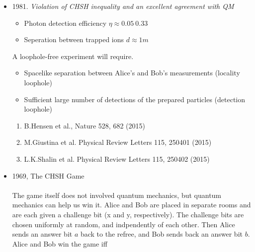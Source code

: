 \documentclass[]{article}
\newtheorem*{example}{Example}
\theoremstyle{nonumberplain}
\begin{document}
\begin{itemize}
\\ \\ 
\[
	QS+RS+RT-QT = (Q+R)S+(R-Q)T = \pm 2
\] 
\[
	(Suppose\ R,Q = \pm 1.\ Thus,\ (R+Q)S=0\ or\ (R-Q)T=0)
\] 
\\
Emsemble average:\ (The curly words mean operator)
\[
	E(\mathcal{QS+RS+RT-QT}) = \sum^{}_{} p(Q,R,S,T)(QS+RS+RT-QT) \leq \sum^{}_{} p(Q,R,S,T)\cdot2 = 2
\] 
\begin{center}
\textit{\textbf{Quantum Theory}}
\end{center}
\[
	E(\mathcal{QS+RS+RT-QT}) = \braket{\psi|\mathcal{QS+RS+RT-QT}|\psi} = \braket{\mathcal{QS}} + \braket{\mathcal{RS}} +\braket{\mathcal{RT}} - \braket{\mathcal{QT}} 
\] 
\begin{example}
\[
	\ket{\psi}=\frac{1}{\sqrt{2}}(\ket{01}-\ket{10})
\] 
\[
Q=Z_{1}\ \ R=X_{1}\ \  S= \frac{-Z_{2}-X_{2}}{\sqrt{2}}\ \ T= \frac{Z_{2}-X_{2}}{\sqrt{2}}
\] 
\[
\braket{\mathcal{QS}} + \braket{\mathcal{RS}}+ \braket{\mathcal{RT}} -\braket{\mathcal{QT}} = 2\sqrt{2} > 2 !!\textit{\textbf{ The Quantum Theory violates Bell's inequality.}}
\] 
\end{example}
	\item 1981. \textit{Violation of CHSH inequality and an excellent agreement with QM}
\begin{itemize}
	\item Photon detection efficiency $\eta \approx 0.05 ~ 0.33$
	\item Seperation between trapped ions $d\approx 1m$
\end{itemize}
	A loophole-free experiment will require.
\begin{itemize}
	\item Spacelike separation between Alice's and Bob's measurements (locality loophole)
	\item Sufficient large number of detections of the prepared particles (detection loophole)
\end{itemize}
\begin{enumerate}
	\item B.Hensen et al., Nature 528, 682 (2015)
	\item M.Giustina et al. Physical Review Letters 115, 250401 (2015)
	\item L.K.Shalin et al. Physical Review Letters 115, 250402 (2015)
\end{enumerate}
	\item 1969, The CHSH Game  \\
		\\
		The game itself does not involved quantum mechanics, but quantum mechanics can help us win it. Alice and Bob are placed in separate rooms and are each given a challenge bit (x and y, respectively). The challenge bits are chosen uniformly at random, and indpendently of each other. Then Alice sends an answer bit $a$ back to the refree, and Bob sends back an answer bit $b$. Alice and Bob win the game iff

\end{itemize}
\end{document}
